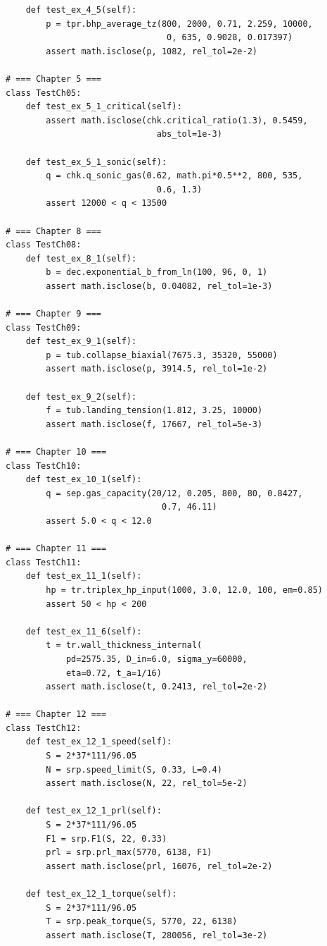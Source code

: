 \documentclass[10pt,a4paper,openany]{book}
\begin{document}
\begin{lstlisting}
    def test_ex_4_5(self):
        p = tpr.bhp_average_tz(800, 2000, 0.71, 2.259, 10000,
                                0, 635, 0.9028, 0.017397)
        assert math.isclose(p, 1082, rel_tol=2e-2)

# === Chapter 5 ===
class TestCh05:
    def test_ex_5_1_critical(self):
        assert math.isclose(chk.critical_ratio(1.3), 0.5459,
                              abs_tol=1e-3)

    def test_ex_5_1_sonic(self):
        q = chk.q_sonic_gas(0.62, math.pi*0.5**2, 800, 535,
                              0.6, 1.3)
        assert 12000 < q < 13500

# === Chapter 8 ===
class TestCh08:
    def test_ex_8_1(self):
        b = dec.exponential_b_from_ln(100, 96, 0, 1)
        assert math.isclose(b, 0.04082, rel_tol=1e-3)

# === Chapter 9 ===
class TestCh09:
    def test_ex_9_1(self):
        p = tub.collapse_biaxial(7675.3, 35320, 55000)
        assert math.isclose(p, 3914.5, rel_tol=1e-2)

    def test_ex_9_2(self):
        f = tub.landing_tension(1.812, 3.25, 10000)
        assert math.isclose(f, 17667, rel_tol=5e-3)

# === Chapter 10 ===
class TestCh10:
    def test_ex_10_1(self):
        q = sep.gas_capacity(20/12, 0.205, 800, 80, 0.8427,
                               0.7, 46.11)
        assert 5.0 < q < 12.0

# === Chapter 11 ===
class TestCh11:
    def test_ex_11_1(self):
        hp = tr.triplex_hp_input(1000, 3.0, 12.0, 100, em=0.85)
        assert 50 < hp < 200

    def test_ex_11_6(self):
        t = tr.wall_thickness_internal(
            pd=2575.35, D_in=6.0, sigma_y=60000,
            eta=0.72, t_a=1/16)
        assert math.isclose(t, 0.2413, rel_tol=2e-2)

# === Chapter 12 ===
class TestCh12:
    def test_ex_12_1_speed(self):
        S = 2*37*111/96.05
        N = srp.speed_limit(S, 0.33, L=0.4)
        assert math.isclose(N, 22, rel_tol=5e-2)

    def test_ex_12_1_prl(self):
        S = 2*37*111/96.05
        F1 = srp.F1(S, 22, 0.33)
        prl = srp.prl_max(5770, 6138, F1)
        assert math.isclose(prl, 16076, rel_tol=2e-2)

    def test_ex_12_1_torque(self):
        S = 2*37*111/96.05
        T = srp.peak_torque(S, 5770, 22, 6138)
        assert math.isclose(T, 280056, rel_tol=3e-2)


\end{lstlisting}
\end{document}
